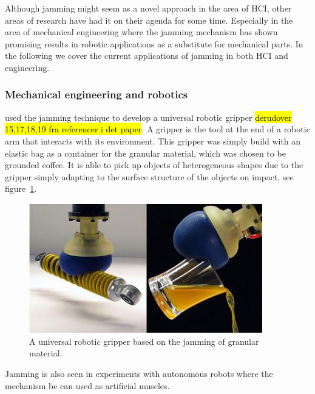 Although jamming might seem as a novel approach in the area of HCI, other areas of research have had it on their agenda for some time. 
Especially in the area of mechanical engineering where the jamming mechanism has shown promising results in robotic applications as a substitute for mechanical parts.
In the following we cover the current applications of jamming in both HCI and engineering. 

\subsubsection{Mechanical engineering and robotics}

\citet{brown2010universal, amend2012positive} used the jamming technique to develop a universal robotic gripper \hl{derudover 15,17,18,19 fra referencer i det paper}. 
A gripper is the tool at the end of a robotic arm that interacts with its environment.
This gripper was simply build with an elastic bag as a container for the granular material, which was chosen to be grounded coffee. 
It is able to pick up objects of heterogeneous shapes due to the gripper simply adapting to the surface structure of the objects on impact, see figure~\ref{fig:ch:jamming:jamming-robot-gripper}. 

\begin{figure}[hb]
	\centering
  		\includegraphics[width=4in]{figures/jamming/jamming-robot-gripper}
	\caption[A universal robotic gripper based on the jamming of granular material by \citet{brown2010universal}.]
   {A universal robotic gripper based on the jamming of granular material.}
   \label{fig:ch:jamming:jamming-robot-gripper}
\end{figure}

Jamming is also seen in experiments with autonomous robots where the mechanism be can used as artificial muscles.

